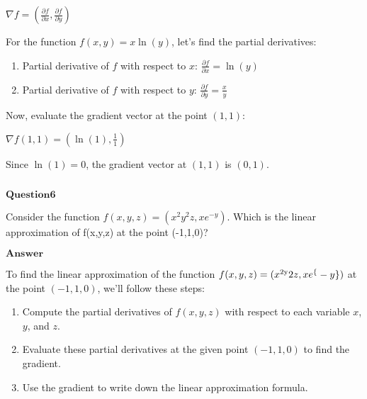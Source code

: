 \documentclass[11pt]{article}
\makeatletter
\providecommand{\tightlist}{%
      \setlength{\itemsep}{0pt}\setlength{\parskip}{0pt}}
\newcommand{\boxspacing}{\kern\kvtcb@left@rule\kern\kvtcb@boxsep}
\newcommand{\prompt}[4]{
        {\ttfamily\llap{{\color{#2}[#3]:\hspace{3pt}#4}}\vspace{-\baselineskip}}
    }
\makeatother
\begin{document}
$ \nabla f = \left( \frac{\partial f}{\partial x},
\frac{\partial f}{\partial y} \right) $

For the function $ f(x, y) = x \ln(y) $, let's find the partial
derivatives:

\begin{enumerate}
\def\labelenumi{\arabic{enumi}.}
\item
  Partial derivative of $ f $ with respect to $ x $: $
  \frac{\partial f}{\partial x} = \ln(y) $
\item
  Partial derivative of $ f $ with respect to $ y $: $
  \frac{\partial f}{\partial y} = \frac{x}{y} $
\end{enumerate}

Now, evaluate the gradient vector at the point $ (1, 1) $:

$ \nabla f(1, 1) = \left( \ln(1), \frac{1}{1} \right) $

Since $ \ln(1) = 0 $, the gradient vector at $ (1, 1) $ is $ (0, 1)
$.

    \begin{tcolorbox}[breakable, size=fbox, boxrule=1pt, pad at break*=1mm,colback=cellbackground, colframe=cellborder]
\prompt{In}{incolor}{ }{\boxspacing}
\begin{Verbatim}[commandchars=\\\{\}]

\end{Verbatim}
\end{tcolorbox}

    $\textbf{Question6}$

Consider the function $f(x,y,z)=(x^2y^2z,xe^{-y})$. Which is the
linear approximation of f(x,y,z) at the point (-1,1,0)?

$\textbf{Answer}$

    To find the linear approximation of the function $ f(x, y, z) =
(x\textsuperscript{2y}2z, xe^\{-y\}) $ at the point $(-1, 1, 0)$,
we'll follow these steps:

\begin{enumerate}
\def\labelenumi{\arabic{enumi}.}
\tightlist
\item
  Compute the partial derivatives of $ f(x, y, z) $ with respect to
  each variable $ x $, $ y $, and $ z $.
\item
  Evaluate these partial derivatives at the given point $(-1, 1, 0)$
  to find the gradient.
\item
  Use the gradient to write down the linear approximation formula.
\end{enumerate}
\end{document}
